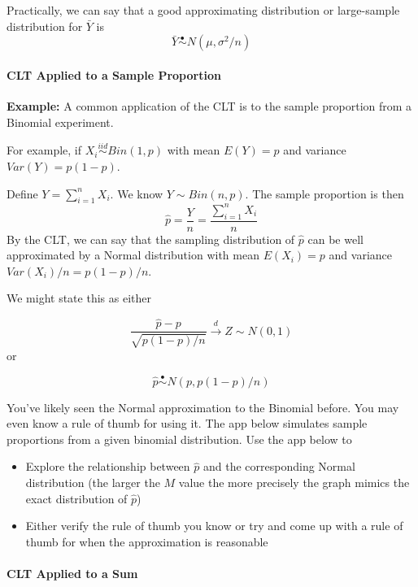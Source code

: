 \documentclass[
]{article}
\providecommand{\tightlist}{%
  \setlength{\itemsep}{0pt}\setlength{\parskip}{0pt}}
\begin{document}
Practically, we can say that a good approximating distribution or
large-sample distribution for \(\bar{Y}\) is
\[\bar{Y}\stackrel{\bullet}\sim N(\mu, \sigma^2/n)\]

\hypertarget{clt-applied-to-a-sample-proportion}{%
\paragraph{CLT Applied to a Sample
Proportion}\label{clt-applied-to-a-sample-proportion}}

\textbf{Example:} A common application of the CLT is to the sample
proportion from a Binomial experiment.

For example, if \(X_i\stackrel{iid}\sim Bin(1, p)\) with mean
\(E(Y) = p\) and variance \(Var(Y) = p(1-p)\).

Define \(Y = \sum_{i=1}^n X_i\). We know \(Y\sim Bin(n, p)\). The sample
proportion is then \[\hat{p}=\frac{Y}{n} = \frac{\sum_{i=1}^n X_i}{n}\]
By the CLT, we can say that the sampling distribution of \(\hat{p}\) can
be well approximated by a Normal distribution with mean \(E(X_i) = p\)
and variance \(Var(X_i)/n = p(1-p)/n\).

We might state this as either

\[\frac{\hat{p}-p}{\sqrt{p(1-p)/n}} \stackrel{d}\rightarrow Z\sim N(0,1)\]
or

\[\hat{p}\stackrel{\bullet}\sim N(p, p(1-p)/n)\]

You've likely seen the Normal approximation to the Binomial before. You
may even know a rule of thumb for using it. The app below simulates
sample proportions from a given binomial distribution. Use the app below
to

\begin{itemize}
\tightlist
\item
  Explore the relationship between \(\hat{p}\) and the corresponding
  Normal distribution (the larger the \(M\) value the more precisely the
  graph mimics the exact distribution of \(\hat{p}\))
\item
  Either verify the rule of thumb you know or try and come up with a
  rule of thumb for when the approximation is reasonable
\end{itemize}

\hypertarget{clt-applied-to-a-sum}{%
\paragraph{CLT Applied to a Sum}\label{clt-applied-to-a-sum}}
\end{document}
